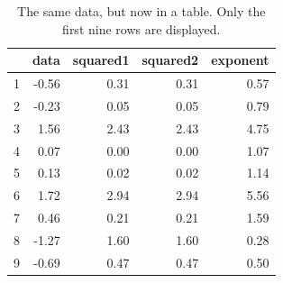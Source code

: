 \documentclass[10pt, fullpage, a4paper, titlepage]{article}
\begin{document}
\begin{table}[h!]
	\centering
	\caption{The same data, but now in a table. Only the first nine rows are displayed.}
	\begin{tabular}{rrrrr}
  		\hline
		 & data & squared1 & squared2 & exponent \\ 
		\hline
		1 & -0.56 & 0.31 & 0.31 & 0.57 \\ 
  		2 & -0.23 & 0.05 & 0.05 & 0.79 \\ 
		3 & 1.56 & 2.43 & 2.43 & 4.75 \\ 
  		4 & 0.07 & 0.00 & 0.00 & 1.07 \\ 
  		5 & 0.13 & 0.02 & 0.02 & 1.14 \\ 
  		6 & 1.72 & 2.94 & 2.94 & 5.56 \\ 
  		7 & 0.46 & 0.21 & 0.21 & 1.59 \\ 
  		8 & -1.27 & 1.60 & 1.60 & 0.28 \\ 
  		9 & -0.69 & 0.47 & 0.47 & 0.50 \\ 
		\hline
	\end{tabular}
\end{table}
\end{document}

